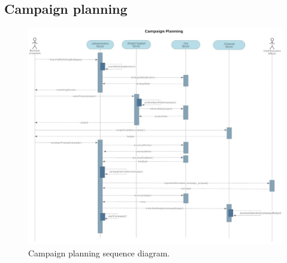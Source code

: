 \subsection{Campaign planning}
\begin{figure}
\begin{centering}
\includegraphics[scale=0.35,angle=90]{assign3/sdraw/imgs/campaign_planning.jpg}
\caption{Campaign planning sequence diagram.}
\label{3img:[sequence]campaign_planning}
\end{centering}
\end{figure}

